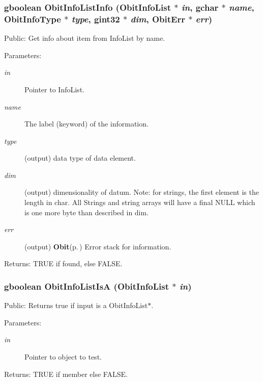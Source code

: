 \subsubsection{\setlength{\rightskip}{0pt plus 5cm}gboolean Obit\-Info\-List\-Info ({\bf Obit\-Info\-List} $\ast$ {\em in}, gchar $\ast$ {\em name}, Obit\-Info\-Type $\ast$ {\em type}, gint32 $\ast$ {\em dim}, {\bf Obit\-Err} $\ast$ {\em err})}\label{ObitInfoList_8c_a16}


Public: Get info about item from Info\-List by name. 

\begin{Desc}
\item[Parameters:]
\begin{description}
\item[{\em in}]Pointer to Info\-List. \item[{\em name}]The label (keyword) of the information. \item[{\em type}](output) data type of data element. \item[{\em dim}](output) dimensionality of datum. Note: for strings, the first element is the length in char. All Strings and string arrays will have a final NULL which is one more byte than described in dim. \item[{\em err}](output) {\bf Obit}{\rm (p.\,\pageref{structObit})} Error stack for information. \end{description}
\end{Desc}
\begin{Desc}
\item[Returns:]TRUE if found, else FALSE. \end{Desc}
\subsubsection{\setlength{\rightskip}{0pt plus 5cm}gboolean Obit\-Info\-List\-Is\-A ({\bf Obit\-Info\-List} $\ast$ {\em in})}\label{ObitInfoList_8c_a23}


Public: Returns true if input is a Obit\-Info\-List$\ast$. 

\begin{Desc}
\item[Parameters:]
\begin{description}
\item[{\em in}]Pointer to object to test. \end{description}
\end{Desc}
\begin{Desc}
\item[Returns:]TRUE if member else FALSE. \end{Desc}
